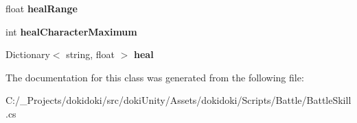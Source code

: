 \begin{DoxyCompactItemize}
\item 
float {\bfseries heal\+Range}\hypertarget{classdoki_battle_1_1_battle_skill_a658fd14b9e1ad65437ff1d41778dabf8}{}\label{classdoki_battle_1_1_battle_skill_a658fd14b9e1ad65437ff1d41778dabf8}

\item 
int {\bfseries heal\+Character\+Maximum}\hypertarget{classdoki_battle_1_1_battle_skill_a837adbd9700634cf63392479072d276c}{}\label{classdoki_battle_1_1_battle_skill_a837adbd9700634cf63392479072d276c}

\item 
Dictionary$<$ string, float $>$ {\bfseries heal}\hypertarget{classdoki_battle_1_1_battle_skill_acf435e59bc6c426fd6679df80fbc5a2d}{}\label{classdoki_battle_1_1_battle_skill_acf435e59bc6c426fd6679df80fbc5a2d}

\end{DoxyCompactItemize}


The documentation for this class was generated from the following file\+:\begin{DoxyCompactItemize}
\item 
C\+:/\+\_\+\+Projects/dokidoki/src/doki\+Unity/\+Assets/dokidoki/\+Scripts/\+Battle/Battle\+Skill.\+cs\end{DoxyCompactItemize}
